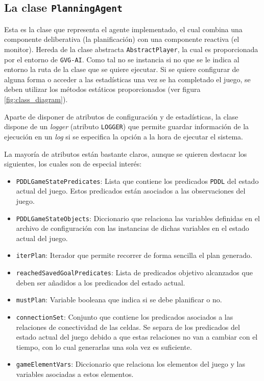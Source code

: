 \subsection{La clase \texttt{PlanningAgent}}

Esta es la clase que representa el agente implementado, el cual combina una componente deliberativa
(la planificación) con una componente reactiva (el monitor). Hereda de la clase abstracta
\texttt{AbstractPlayer}, la cual es proporcionada por el entorno de \texttt{GVG-AI}. Como
tal no se instancia si no que se le indica al entorno la ruta de la clase que se quiere ejecutar.
Si se quiere configurar de alguna forma o acceder a las estadísticas una vez se ha completado
el juego, se deben utilizar los métodos estáticos proporcionados (ver figura \ref{fig:class_diagram}).

Aparte de disponer de atributos de configuración y de estadísticas, la clase dispone de un \textit{logger}
(atributo \texttt{LOGGER}) que permite guardar información de la ejecución en un \textit{log} si
se especifica la opción a la hora de ejecutar el sistema.

La mayoría de atributos están bastante claros, aunque se quieren destacar los siguientes, los cuales
son de especial interés:

\begin{itemize}[label=\textbullet]
    \item \texttt{PDDLGameStatePredicates}: Lista que contiene los predicados \texttt{PDDL} del estado
    actual del juego. Estos predicados están asociados a las observaciones del juego.
    
    \item \texttt{PDDLGameStateObjects}: Diccionario que relaciona las variables definidas en el archivo
    de configuración con las instancias de dichas variables en el estado actual del juego.
    
    \item \texttt{iterPlan}: Iterador que permite recorrer de forma sencilla el plan generado.
    
    \item \texttt{reachedSavedGoalPredicates}: Lista de predicados objetivo alcanzados que deben
    ser añadidos a los predicados del estado actual.
    
    \item \texttt{mustPlan}: Variable booleana que indica si se debe planificar o no.
    
    \item \texttt{connectionSet}: Conjunto que contiene los predicados asociados a las relaciones
    de conectividad de las celdas. Se separa de los predicados del estado actual del juego debido
    a que estas relaciones no van a cambiar con el tiempo, con lo cual generarlas una sola vez
    es suficiente.
    
    \item \texttt{gameElementVars}: Diccionario que relaciona los elementos del juego y las
    variables asociadas a estos elementos.
\end{itemize}

